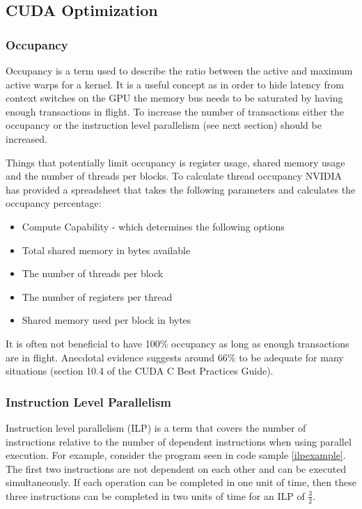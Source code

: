 \subsection{CUDA Optimization}
\subsubsection{Occupancy}\label{subsubsec:occupancy}
Occupancy is a term used to describe the ratio between the active and maximum active warps for a kernel.
It is a useful concept as in order to hide latency from context switches on the GPU the memory bus needs to be saturated by having enough transactions in flight.
To increase the number of transactions either the occupancy or the instruction level parallelism (see next section) should be increased.

Things that potentially limit occupancy is register usage, shared memory usage and the number of threads per blocks.
To calculate thread occupancy NVIDIA has provided a spreadsheet\cite{occupancycalculator} that takes the following parameters and calculates the occupancy percentage:
\begin{itemize}
\item Compute Capability - which determines the following options
\item Total shared memory in bytes available
\item The number of threads per block
\item The number of registers per thread
\item Shared memory used per block in bytes
\end{itemize}

It is often not beneficial to have 100\% occupancy as long as enough transactions are in flight\cite{volkovoccupancy}.
Anecdotal evidence suggests around 66\% to be adequate for many situations (section 10.4 of the CUDA C Best Practices Guide\cite{cudacoccupancy}).


\subsubsection{Instruction Level Parallelism}\label{subsubsec:ilp}
Instruction level parallelism (ILP) is a term that covers the number of instructions relative to the number of dependent instructions when using parallel execution.
For example, consider the program seen in code sample \ref{ilpexample}.
The first two instructions are not dependent on each other and can be executed simultaneously.
If each operation can be completed in one unit of time, then these three instructions can be completed in two units of time for an ILP of $\frac{3}{2}$.

